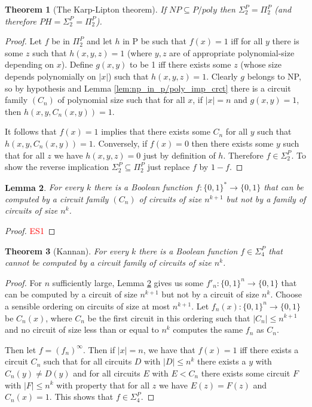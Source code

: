\documentclass{report}
\theoremstyle{definition}
\theoremstyle{plain}
\newtheorem{thm}{Theorem}[section]
\newtheorem{lem}[thm]{Lemma}
\theoremstyle{definition}
\begin{document}
	\begin{thm}[The Karp-Lipton theorem]
		If $NP \subseteq P/poly$ then $\Sigma_2^P = \Pi_2^P$ (and therefore $PH=\Sigma_2^P = \Pi_2^P$).
	\end{thm}
	\begin{proof}
		Let $f$ be in $\Pi_2^P$ and let $h$ in P be such that $f(x) = 1$ iff for all $y$ there is some $z$ such that $h(x,y,z) = 1$ (where $y,z$ are of appropriate polynomial-size depending on $x$). Define $g(x,y)$ to be 1 iff there exists some $z$ (whose size depends polynomially on $|x|$) such that $h(x,y,z) = 1$. Clearly $g$ belongs to NP, so by hypothesis and Lemma \ref{lem:np_in_p/poly_imp_crct} there is a circuit family $(C_n)$ of polynomial size such that for all $x$, if $|x| = n$ and $g(x,y) = 1$, then $h(x,y,C_n(x,y)) = 1$.
		
		It follows that $f(x) = 1$ implies that there exists some $C_n$ for all $y$ such that $h(x,y,C_n(x,y)) = 1$. Conversely, if $f(x) = 0$ then there exists some $y$ such that for all $z$ we have $h(x,y,z) = 0$ just by definition of $h$. Therefore $f\in\Sigma_2^P$. To show the reverse implication $\Sigma_2^P\subseteq \Pi_2^P$ just replace $f$ by $1-f$.
	\end{proof}
	\begin{lem}\label{lem:bool_fun_neg_comp_crct}
		For every $k$ there is a Boolean function $f\colon \{0,1\}^* \to \{0,1\}$ that can be computed by a circuit family $(C_n)$ of circuits of size $n^{k+1}$ but not by a family of circuits of size $n^k$.
	\end{lem}
	\begin{proof}
		\textcolor{red}{ES1}
	\end{proof}
	\begin{thm}[Kannan]\label{thm:bool_neg_circt}
		For every $k$ there is a Boolean function $f\in \Sigma_4^P$ that cannot be computed by a circuit family of circuits of size $n^k$.
	\end{thm}
	\begin{proof}
		For $n$ sufficiently large, Lemma \ref{lem:bool_fun_neg_comp_crct} gives us some $f'_n\colon \{0,1\}^n \to \{0,1\}$ that can be computed by a circuit of size $n^{k+1}$ but not by a circuit of size $n^k$. Choose a sensible ordering on circuits of size at most $n^{k+1}$. Let $f_n(x)\colon \{0,1\}^n \to \{0,1\}$ be $C_n(x)$, where $C_n$ be the first circuit in this ordering such that $|C_n|\leq n^{k+1}$ and no circuit of size less than or equal to $n^k$ computes the same $f_n$ as $C_n$.
		
		Then let $f = (f_n)^\infty$. Then if $|x| = n$, we have that $f(x) = 1$ iff there exists a circuit $C_n$ such that for all circuits $D$ with $|D|\leq n^k$ there exists a $y$ with $C_n(y)\neq D(y)$ and for all circuits $E$ with $E<C_n$ there exists some circuit $F$ with $|F|\leq n^k$ with property that for all $z$ we have $E(z) = F(z)$ and $C_n(x) =1$. This shows that $f\in \Sigma_4^{P}$.
	\end{proof}
\end{document}
